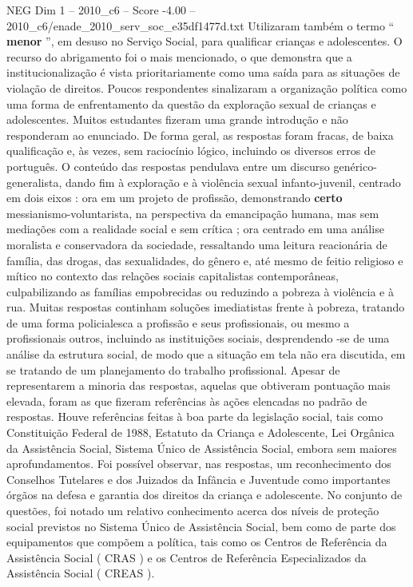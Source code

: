 \begin{textsample}{NEG Dim 1 – 2010\_c6 – Score -4.00 – 2010\_c6/enade\_2010\_serv\_soc\_e35df1477d.txt}
Utilizaram também o termo “ \textbf{menor} ”, em desuso no Serviço Social, para qualificar crianças e adolescentes.
O recurso do abrigamento foi o mais mencionado, o que demonstra que a institucionalização é vista prioritariamente como uma saída para as situações de violação de direitos.
Poucos respondentes sinalizaram a organização política como uma forma de enfrentamento da questão da exploração sexual de crianças e adolescentes.
Muitos estudantes fizeram uma grande introdução e não responderam ao enunciado.
De forma geral, as respostas foram fracas, de baixa qualificação e, às vezes, sem raciocínio lógico, incluindo os diversos erros de português.
O conteúdo das respostas pendulava entre um discurso genérico-generalista, dando fim à exploração e à violência sexual infanto-juvenil, centrado em dois eixos : ora em um projeto de profissão, demonstrando \textbf{certo} messianismo-voluntarista, na perspectiva da emancipação humana, mas sem mediações com a realidade social e sem crítica ; ora centrado em uma análise moralista e conservadora da sociedade, ressaltando uma leitura reacionária de família, das drogas, das sexualidades, do gênero e, até mesmo de feitio religioso e mítico no contexto das relações sociais capitalistas contemporâneas, culpabilizando as famílias empobrecidas ou reduzindo a pobreza à violência e à rua.
Muitas respostas continham soluções imediatistas frente à pobreza, tratando de uma forma policialesca a profissão e seus profissionais, ou mesmo a profissionais outros, incluindo as instituições sociais, desprendendo -se de uma análise da estrutura social, de modo que a situação em tela não era discutida, em se tratando de um planejamento do trabalho profissional.
Apesar de representarem a minoria das respostas, aquelas que obtiveram pontuação mais elevada, foram as que fizeram referências às ações elencadas no padrão de respostas.
Houve referências feitas à boa parte da legislação social, tais como Constituição Federal de 1988, Estatuto da Criança e Adolescente, Lei Orgânica da Assistência Social, Sistema Único de Assistência Social, embora sem maiores aprofundamentos.
Foi possível observar, nas respostas, um reconhecimento dos Conselhos Tutelares e dos Juizados da Infância e Juventude como importantes órgãos na defesa e garantia dos direitos da criança e adolescente.
No conjunto de questões, foi notado um relativo conhecimento acerca dos níveis de proteção social previstos no Sistema Único de Assistência Social, bem como de parte dos equipamentos que compõem a política, tais como os Centros de Referência da Assistência Social ( CRAS ) e os Centros de Referência Especializados da Assistência Social ( CREAS ).

\end{textsample}
